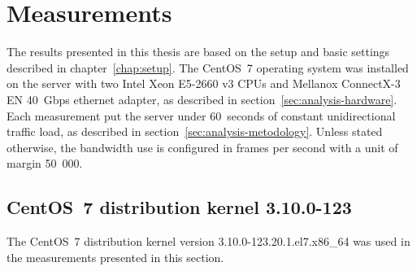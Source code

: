 
\chapter{Measurements}\label{chap:measurements}
The results presented in this thesis are based on the setup and basic settings described in chapter~\ref{chap:setup}.
The CentOS~7 operating system
was installed on the server with two Intel Xeon E5-2660 v3 CPUs
and Mellanox ConnectX-3 EN 40~Gbps ethernet adapter, as described in section~\ref{sec:analysis-hardware}.
Each measurement put the server under 60~seconds of constant unidirectional traffic load,
as described in section~\ref{sec:analysis-metodology}.
Unless stated otherwise,
the bandwidth use is configured in frames per second with a unit of margin 50~000.

\section{CentOS~7 distribution kernel 3.10.0-123}
The CentOS~7 distribution kernel version 3.10.0-123.20.1.el7.x86\_64
was used in the measurements presented in this section.

	
	
	
	
	
	
	
	
	
	
	
	
	
	
	

	


	
